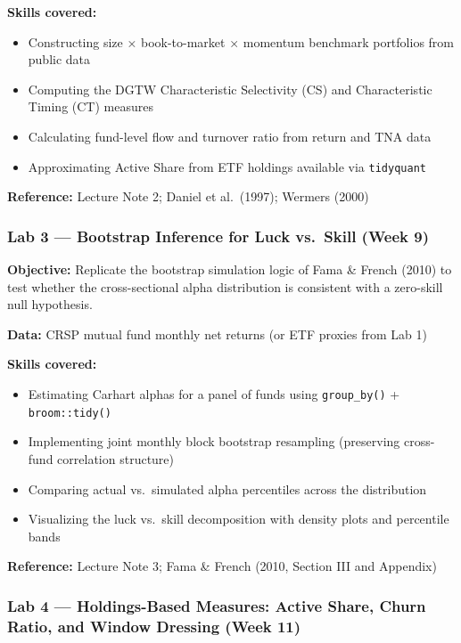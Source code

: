 \documentclass[
  12pt,
  letterpaper,
  DIV=11,
  numbers=noendperiod]{scrartcl}
\providecommand{\tightlist}{%
  \setlength{\itemsep}{0pt}\setlength{\parskip}{0pt}}
\begin{document}
\textbf{Skills covered:}

\begin{itemize}
\tightlist
\item
  Constructing size × book-to-market × momentum benchmark portfolios
  from public data
\item
  Computing the DGTW Characteristic Selectivity (CS) and Characteristic
  Timing (CT) measures
\item
  Calculating fund-level flow and turnover ratio from return and TNA
  data
\item
  Approximating Active Share from ETF holdings available via
  \texttt{tidyquant}
\end{itemize}

\textbf{Reference:} Lecture Note 2; Daniel et al.~(1997); Wermers (2000)

\subsubsection{Lab 3 --- Bootstrap Inference for Luck vs.~Skill (Week
9)}\label{lab-3-bootstrap-inference-for-luck-vs.-skill-week-9}

\textbf{Objective:} Replicate the bootstrap simulation logic of Fama \&
French (2010) to test whether the cross-sectional alpha distribution is
consistent with a zero-skill null hypothesis.

\textbf{Data:} CRSP mutual fund monthly net returns (or ETF proxies from
Lab 1)

\textbf{Skills covered:}

\begin{itemize}
\tightlist
\item
  Estimating Carhart alphas for a panel of funds using
  \texttt{group\_by()} + \texttt{broom::tidy()}
\item
  Implementing joint monthly block bootstrap resampling (preserving
  cross-fund correlation structure)
\item
  Comparing actual vs.~simulated alpha percentiles across the
  distribution
\item
  Visualizing the luck vs.~skill decomposition with density plots and
  percentile bands
\end{itemize}

\textbf{Reference:} Lecture Note 3; Fama \& French (2010, Section III
and Appendix)

\subsubsection{Lab 4 --- Holdings-Based Measures: Active Share, Churn
Ratio, and Window Dressing (Week
11)}\label{lab-4-holdings-based-measures-active-share-churn-ratio-and-window-dressing-week-11}
\end{document}
